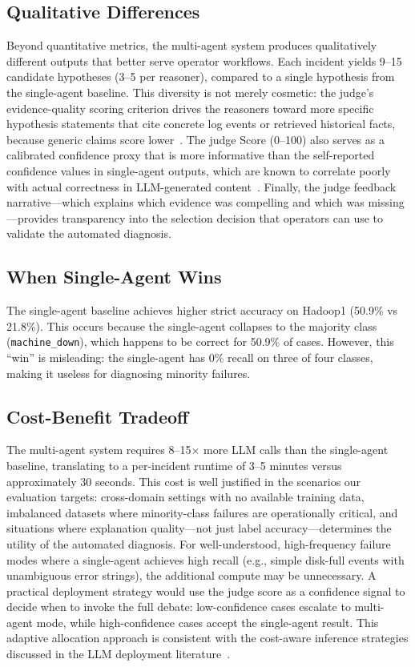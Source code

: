 \subsection{Qualitative Differences}

Beyond quantitative metrics, the multi-agent system produces qualitatively different outputs that
better serve operator workflows. Each incident yields 9--15 candidate hypotheses (3--5 per
reasoner), compared to a single hypothesis from the single-agent baseline. This diversity is
not merely cosmetic: the judge's evidence-quality scoring criterion drives the reasoners toward
more specific hypothesis statements that cite concrete log events or retrieved historical facts,
because generic claims score lower~\cite{du2023improvingfactualityreasoninglanguage}. The judge
Score (0--100) also serves as a calibrated confidence proxy that is more informative than the
self-reported confidence values in single-agent outputs, which are known to correlate poorly
with actual correctness in LLM-generated
content~\cite{chen2024rcacopilot}. Finally, the judge feedback narrative---which explains which
evidence was compelling and which was missing---provides transparency into the selection decision
that operators can use to validate the automated diagnosis.

\subsection{When Single-Agent Wins}
The single-agent baseline achieves higher strict accuracy on Hadoop1 (50.9\% vs 21.8\%). This
occurs because the single-agent collapses to the majority class (\texttt{machine\_down}), which
happens to be correct for 50.9\% of cases. However, this ``win'' is misleading: the single-agent
has 0\% recall on three of four classes, making it useless for diagnosing minority failures.

\subsection{Cost-Benefit Tradeoff}

The multi-agent system requires 8--15$\times$ more LLM calls than the single-agent baseline,
translating to a per-incident runtime of 3--5 minutes versus approximately 30 seconds. This
cost is well justified in the scenarios our evaluation targets: cross-domain settings with no
available training data, imbalanced datasets where minority-class failures are operationally
critical, and situations where explanation quality---not just label accuracy---determines the
utility of the automated diagnosis. For well-understood, high-frequency failure modes where a
single-agent achieves high recall (e.g., simple disk-full events with unambiguous error strings),
the additional compute may be unnecessary. A practical deployment strategy would use the judge
score as a confidence signal to decide when to invoke the full debate: low-confidence cases
escalate to multi-agent mode, while high-confidence cases accept the single-agent result. This
adaptive allocation approach is consistent with the cost-aware inference strategies discussed in
the LLM deployment literature~\cite{chen2024rcacopilot}.

